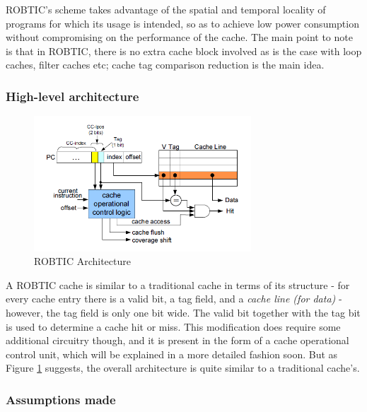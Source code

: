 \documentclass[conference]{IEEEtran}
\begin{document}
ROBTIC's scheme takes advantage of the spatial and temporal locality of programs for which its usage is intended, so as to achieve low power consumption without compromising on the performance of the cache. The main point to note is that in ROBTIC, there is no extra cache block involved as is the case with loop caches, filter caches etc; cache tag comparison reduction is the main idea.

\subsubsection{High-level architecture}

\begin{figure}[!h]
	\centering
	\includegraphics[width=3.2in]{images/architecture_ROBTIC.PNG}
	\caption{ROBTIC Architecture \cite{robtic}}
	\label{fig:robtic_arch}
\end{figure}

A ROBTIC cache is similar to a traditional cache in terms of its structure - for every cache entry there is a valid bit, a tag field, and a \textit{cache line (for data)} - however, the tag field is only one bit wide. The valid bit together with the tag bit is used to determine a cache hit or miss. This modification does require some additional circuitry though, and it is present in the form of a cache operational control unit, which will be explained in a more detailed fashion soon. But as Figure \ref{fig:robtic_arch} suggests, the overall architecture is quite similar to a traditional cache's.

\subsubsection{Assumptions made}
\end{document}
